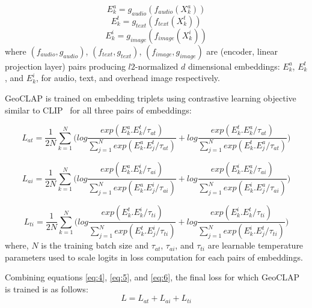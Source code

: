 \documentclass{bmvc2k}
\begin{document}
\begin{equation}\label{eq:1}
E_{k}^{a} = g_{audio}(f_{audio}(X_{k}^{a}))
\end{equation}
\begin{equation}\label{eq:2}
E_{k}^{t} = g_{text}(f_{text}(X_{k}^{t}))
\end{equation}
\begin{equation}\label{eq:3}
E_{k}^{i} = g_{image}(f_{image}(X_{k}^{i}))
\end{equation} where $(f_{audio}, g_{audio})$, $(f_{text}, g_{text})$, $(f_{image}, g_{image})$  are (encoder, linear projection layer) pairs producing $l2$-normalized $d$ dimensional embeddings: $E_{k}^{a}$, $E_{k}^{t}$, and $E_{k}^{i}$, for audio, text, and overhead image respectively. 

GeoCLAP is trained on embedding triplets using contrastive learning objective similar to CLIP~\cite{radford2021learning} for all three pairs of embeddings:

\begin{equation}\label{eq:4}
    L_{at} = \frac{1}{2N}\sum_{k=1}^{N}\bigg(log \frac{exp(E_{k}^{a}.E_{k}^{t}/\tau_{at})}{\sum_{j=1}^{N}exp(E_{k}^{a}.E_{j}^{t}/\tau_{at})} + log\frac{exp(E_{k}^{t}.E_{k}^{a}/\tau_{at})}{\sum_{j=1}^{N}exp(E_{k}^{t}.E_{j}^{a}/\tau_{at})}\bigg)
\end{equation}

\begin{equation}\label{eq:5}
    L_{ai} = \frac{1}{2N}\sum_{k=1}^{N}\bigg(log \frac{exp(E_{k}^{a}.E_{k}^{i}/\tau_{ai})}{\sum_{j=1}^{N}exp(E_{k}^{a}.E_{j}^{i}/\tau_{ai})} + log\frac{exp(E_{k}^{i}.E_{k}^{a}/\tau_{ai})}{\sum_{j=1}^{N}exp(E_{k}^{i}.E_{j}^{a}/\tau_{ai})}\bigg)
\end{equation}

\begin{equation}\label{eq:6}
    L_{ti} = \frac{1}{2N}\sum_{k=1}^{N}\bigg(log \frac{exp(E_{k}^{t}.E_{k}^{i}/\tau_{ti})}{\sum_{j=1}^{N}exp(E_{k}^{t}.E_{j}^{i}/\tau_{ti})} + log\frac{exp(E_{k}^{i}.E_{k}^{t}/\tau_{ti})}{\sum_{j=1}^{N}exp(E_{k}^{i}.E_{j}^{t}/\tau_{ti})}\bigg)
\end{equation} where, $N$ is the training batch size and $\tau_{at}$, $\tau_{ai}$, and $\tau_{ti}$ are learnable temperature parameters used to scale logits in loss computation for each pairs of embeddings.

Combining equations \ref{eq:4}, \ref{eq:5}, and \ref{eq:6}, the final loss for which GeoCLAP is trained is as follows:
\begin{equation}\label{eq:7}
    L = L_{at} + L_{ai} + L_{ti}
\end{equation}
\end{document}
